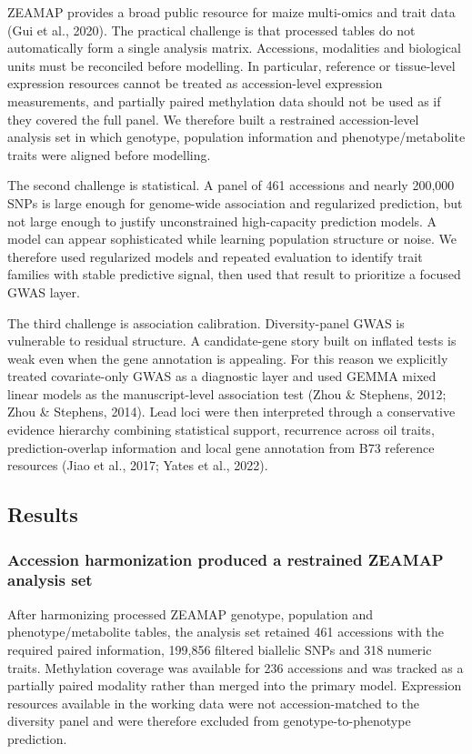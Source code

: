 \documentclass[
]{article}
\begin{document}
ZEAMAP provides a broad public resource for maize multi-omics and trait
data (Gui et al., 2020). The practical challenge is that processed
tables do not automatically form a single analysis matrix. Accessions,
modalities and biological units must be reconciled before modelling. In
particular, reference or tissue-level expression resources cannot be
treated as accession-level expression measurements, and partially paired
methylation data should not be used as if they covered the full panel.
We therefore built a restrained accession-level analysis set in which
genotype, population information and phenotype/metabolite traits were
aligned before modelling.

The second challenge is statistical. A panel of 461 accessions and
nearly 200,000 SNPs is large enough for genome-wide association and
regularized prediction, but not large enough to justify unconstrained
high-capacity prediction models. A model can appear sophisticated while
learning population structure or noise. We therefore used regularized
models and repeated evaluation to identify trait families with stable
predictive signal, then used that result to prioritize a focused GWAS
layer.

The third challenge is association calibration. Diversity-panel GWAS is
vulnerable to residual structure. A candidate-gene story built on
inflated tests is weak even when the gene annotation is appealing. For
this reason we explicitly treated covariate-only GWAS as a diagnostic
layer and used GEMMA mixed linear models as the manuscript-level
association test (Zhou \& Stephens, 2012; Zhou \& Stephens, 2014). Lead
loci were then interpreted through a conservative evidence hierarchy
combining statistical support, recurrence across oil traits,
prediction-overlap information and local gene annotation from B73
reference resources (Jiao et al., 2017; Yates et al., 2022).

\subsection{Results}\label{results}

\subsubsection{Accession harmonization produced a restrained ZEAMAP
analysis
set}\label{accession-harmonization-produced-a-restrained-zeamap-analysis-set}

After harmonizing processed ZEAMAP genotype, population and
phenotype/metabolite tables, the analysis set retained 461 accessions
with the required paired information, 199,856 filtered biallelic SNPs
and 318 numeric traits. Methylation coverage was available for 236
accessions and was tracked as a partially paired modality rather than
merged into the primary model. Expression resources available in the
working data were not accession-matched to the diversity panel and were
therefore excluded from genotype-to-phenotype prediction.
\end{document}
